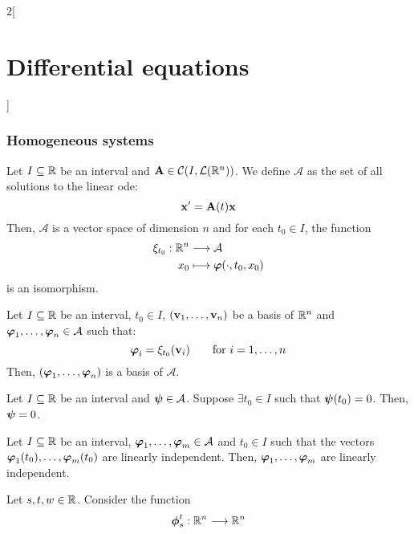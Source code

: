 \documentclass[../../../main.tex]{subfiles}
\begin{document}
\begin{multicols}{2}[\section{Differential equations}]
  \subsubsection*{Homogeneous systems}
  \begin{theorem}
    Let $I\subseteq\mathbb{R}$ be an interval and $\boldsymbol{\mathrm{A}}\in\mathcal{C}(I,\mathcal{L}(\mathbb{R}^n))$. We define $\mathcal{A}$ as the set of all solutions to the linear ode:
    \begin{equation}\label{DE_homo}
      \boldsymbol{\mathrm{x}}'=\boldsymbol{\mathrm{A}}(t)\boldsymbol{\mathrm{x}}
    \end{equation} Then, $\mathcal{A}$ is a vector space of dimension $n$ and for each $t_0\in I$, the function
    \begin{align*}
      \xi_{t_0}:\mathbb{R}^n & \longrightarrow\mathcal{A}                         \\
      x_0             & \longmapsto\boldsymbol{\mathrm{\varphi}}(\cdot,t_0,x_0)
    \end{align*}
    is an isomorphism.
  \end{theorem}
  \begin{corollary}
    Let $I\subseteq\mathbb{R}$ be an interval, $t_0\in I$, $(\boldsymbol{\mathrm{v}}_1,\ldots,\boldsymbol{\mathrm{v}}_n)$ be a basis of $\mathbb{R}^n$ and $\boldsymbol{\mathrm{\varphi}}_1,\ldots,\boldsymbol{\mathrm{\varphi}}_n\in\mathcal{A}$ such that: $$\boldsymbol{\mathrm{\varphi}}_i=\xi_{t_0}(\boldsymbol{\mathrm{v}}_i)\qquad\text{for } i=1,\ldots,n$$
    Then, $(\boldsymbol{\mathrm{\varphi}}_1,\ldots,\boldsymbol{\mathrm{\varphi}}_n)$ is a basis of $\mathcal{A}$.
  \end{corollary}
  \begin{corollary}
    Let $I\subseteq\mathbb{R}$ be an interval and $\boldsymbol{\mathrm{\psi}}\in\mathcal{A}$. Suppose $\exists t_0\in I$ such that $\boldsymbol{\mathrm{\psi}} (t_0)=0$. Then, $\boldsymbol{\mathrm{\psi}}=0$.
  \end{corollary}
  \begin{corollary}
    Let $I\subseteq\mathbb{R}$ be an interval, $\boldsymbol{\mathrm{\varphi}}_1,\ldots,\boldsymbol{\mathrm{\varphi}}_m\in\mathcal{A}$ and $t_0\in I$ such that the vectors $\boldsymbol{\mathrm{\varphi}}_1(t_0),\ldots,\boldsymbol{\mathrm{\varphi}}_m(t_0)$ are linearly independent. Then, $\boldsymbol{\mathrm{\varphi}}_1,\ldots,\boldsymbol{\mathrm{\varphi}}_m$ are linearly independent.
  \end{corollary}
  \begin{corollary}
    Let $s,t,w\in\mathbb{R}$. Consider the function
    \begin{align*}
      \vectorfunction{\phi}_s^t:\RR^n & \longrightarrow\RR^n     \\

\end{align*}
\end{corollary}
\end{multicols}
\end{document}

